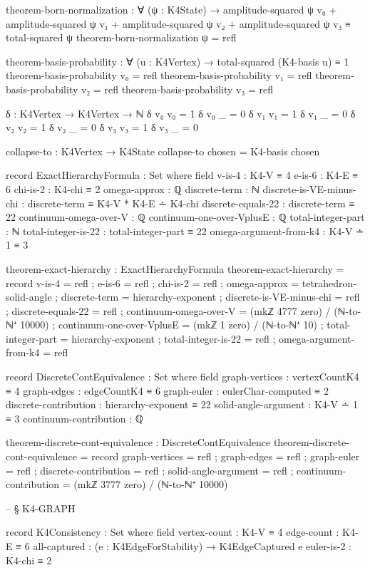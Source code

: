 \documentclass[11pt,a4paper]{book}
\begin{document}
\begin{code}
theorem-born-normalization : ∀ (ψ : K4State) →
  amplitude-squared ψ v₀ + amplitude-squared ψ v₁ 
  + amplitude-squared ψ v₂ + amplitude-squared ψ v₃ 
  ≡ total-squared ψ
theorem-born-normalization ψ = refl

theorem-basis-probability : ∀ (u : K4Vertex) →
  total-squared (K4-basis u) ≡ 1
theorem-basis-probability v₀ = refl
theorem-basis-probability v₁ = refl
theorem-basis-probability v₂ = refl
theorem-basis-probability v₃ = refl

δ : K4Vertex → K4Vertex → ℕ
δ v₀ v₀ = 1
δ v₀ _  = 0
δ v₁ v₁ = 1
δ v₁ _  = 0
δ v₂ v₂ = 1
δ v₂ _  = 0
δ v₃ v₃ = 1
δ v₃ _  = 0

collapse-to : K4Vertex → K4State
collapse-to chosen = K4-basis chosen

record ExactHierarchyFormula : Set where
  field
    v-is-4 : K4-V ≡ 4
    e-is-6 : K4-E ≡ 6
    chi-is-2 : K4-chi ≡ 2
    omega-approx : ℚ
    discrete-term : ℕ
    discrete-is-VE-minus-chi : discrete-term ≡ K4-V * K4-E ∸ K4-chi
    discrete-equals-22 : discrete-term ≡ 22
    continuum-omega-over-V : ℚ
    continuum-one-over-VplusE : ℚ
    total-integer-part : ℕ
    total-integer-is-22 : total-integer-part ≡ 22
    omega-argument-from-k4 : K4-V ∸ 1 ≡ 3

theorem-exact-hierarchy : ExactHierarchyFormula
theorem-exact-hierarchy = record
  { v-is-4 = refl
  ; e-is-6 = refl
  ; chi-is-2 = refl
  ; omega-approx = tetrahedron-solid-angle
  ; discrete-term = hierarchy-exponent
  ; discrete-is-VE-minus-chi = refl
  ; discrete-equals-22 = refl
  ; continuum-omega-over-V = (mkℤ 4777 zero) / (ℕ-to-ℕ⁺ 10000)
  ; continuum-one-over-VplusE = (mkℤ 1 zero) / (ℕ-to-ℕ⁺ 10)
  ; total-integer-part = hierarchy-exponent
  ; total-integer-is-22 = refl
  ; omega-argument-from-k4 = refl
  }

record DiscreteContEquivalence : Set where
  field
    graph-vertices : vertexCountK4 ≡ 4
    graph-edges : edgeCountK4 ≡ 6
    graph-euler : eulerChar-computed ≡ 2
    discrete-contribution : hierarchy-exponent ≡ 22
    solid-angle-argument : K4-V ∸ 1 ≡ 3
    continuum-contribution : ℚ

theorem-discrete-cont-equivalence : DiscreteContEquivalence
theorem-discrete-cont-equivalence = record
  { graph-vertices = refl
  ; graph-edges = refl
  ; graph-euler = refl
  ; discrete-contribution = refl
  ; solid-angle-argument = refl
  ; continuum-contribution = (mkℤ 3777 zero) / (ℕ-to-ℕ⁺ 10000)
  }


-- § K4-GRAPH

record K4Consistency : Set where
  field
    vertex-count     : K4-V ≡ 4
    edge-count       : K4-E ≡ 6
    all-captured     : (e : K4EdgeForStability) → K4EdgeCaptured e
    euler-is-2       : K4-chi ≡ 2


\end{code}
\end{document}

